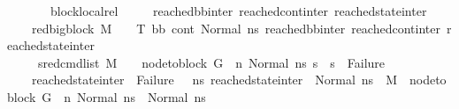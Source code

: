\begin{isabellebody}
\ \ \ \ \ \ \ block{\isacharunderscore}{\kern0pt}local{\isacharunderscore}{\kern0pt}rel{\isacharcolon}{\kern0pt}\isanewline
\ \ \ \ {\isachardoublequoteopen}{\isasymAnd}\ reached{\isacharunderscore}{\kern0pt}bb{\isacharunderscore}{\kern0pt}inter\ reached{\isacharunderscore}{\kern0pt}cont{\isacharunderscore}{\kern0pt}inter\ reached{\isacharunderscore}{\kern0pt}state{\isacharunderscore}{\kern0pt}inter{\isachardot}{\kern0pt}\ \isanewline
\ \ \ \ {\isacharparenleft}{\kern0pt}red{\isacharunderscore}{\kern0pt}bigblock\ M\ {\isasymLambda}\ {\isasymGamma}\ {\isasymOmega}\ T\ {\isacharparenleft}{\kern0pt}bb{\isacharcomma}{\kern0pt}\ cont{}{\isacharcomma}{\kern0pt}\ {\isacharparenleft}{\kern0pt}Normal\ ns{}{\isacharparenright}{\kern0pt}{\isacharparenright}{\kern0pt}\ {\isacharparenleft}{\kern0pt}reached{\isacharunderscore}{\kern0pt}bb{\isacharunderscore}{\kern0pt}inter{\isacharcomma}{\kern0pt}\ reached{\isacharunderscore}{\kern0pt}cont{\isacharunderscore}{\kern0pt}inter{\isacharcomma}{\kern0pt}\ reached{\isacharunderscore}{\kern0pt}state{\isacharunderscore}{\kern0pt}inter{\isacharparenright}{\kern0pt}{\isacharparenright}{\kern0pt}\ {\isasymLongrightarrow}\ \isanewline
\ \ \ \ {\isacharparenleft}{\kern0pt}{\isasymAnd}\ s{}{\isacharprime}{\kern0pt}{\isachardot}{\kern0pt}{\isacharparenleft}{\kern0pt}{\isacharparenleft}{\kern0pt}red{\isacharunderscore}{\kern0pt}cmd{\isacharunderscore}{\kern0pt}list\ M\ {\isasymLambda}\ {\isasymGamma}\ {\isasymOmega}\ {\isacharparenleft}{\kern0pt}node{\isacharunderscore}{\kern0pt}to{\isacharunderscore}{\kern0pt}block\ G\ {\isacharbang}{\kern0pt}\ n{\isacharparenright}{\kern0pt}\ {\isacharparenleft}{\kern0pt}Normal\ ns{}{\isacharparenright}{\kern0pt}\ s{}{\isacharprime}{\kern0pt}{\isacharparenright}{\kern0pt}\ {\isasymLongrightarrow}\ {\isacharparenleft}{\kern0pt}s{}{\isacharprime}{\kern0pt}\ {\isasymnoteq}\ Failure{\isacharparenright}{\kern0pt}{\isacharparenright}{\kern0pt}{\isacharparenright}{\kern0pt}\ {\isasymLongrightarrow}\ \ \ \isanewline
\ \ \ \ {\isacharparenleft}{\kern0pt}reached{\isacharunderscore}{\kern0pt}state{\isacharunderscore}{\kern0pt}inter\ {\isasymnoteq}\ Failure\ \ {\isasymand}\ {\isacharparenleft}{\kern0pt}{\isasymforall}ns{}{\isacharprime}{\kern0pt}{\isachardot}{\kern0pt}\ reached{\isacharunderscore}{\kern0pt}state{\isacharunderscore}{\kern0pt}inter\ {\isacharequal}{\kern0pt}\ Normal\ ns{}{\isacharprime}{\kern0pt}\ {\isasymlongrightarrow}\ {\isacharparenleft}{\kern0pt}M{\isacharcomma}{\kern0pt}{\isasymLambda}{\isacharcomma}{\kern0pt}{\isasymGamma}{\isacharcomma}{\kern0pt}{\isasymOmega}\ {\isasymturnstile}\ {\isasymlangle}{\isacharparenleft}{\kern0pt}node{\isacharunderscore}{\kern0pt}to{\isacharunderscore}{\kern0pt}block\ G\ {\isacharbang}{\kern0pt}\ n{\isacharparenright}{\kern0pt}{\isacharcomma}{\kern0pt}\ Normal\ ns{}{\isasymrangle}\ {\isacharbrackleft}{\kern0pt}{\isasymrightarrow}{\isacharbrackright}{\kern0pt}\ Normal\ ns{}{\isacharprime}{\kern0pt}{\isacharparenright}{\kern0pt}{\isacharparenright}{\kern0pt}{\isacharparenright}{\kern0pt}{\isachardoublequoteclose}\isanewline

\end{isabellebody}
